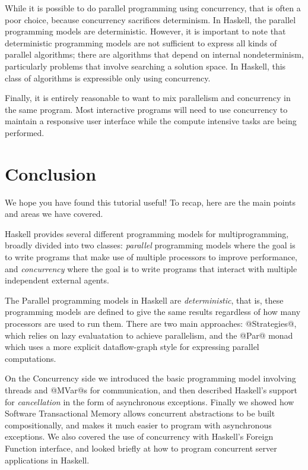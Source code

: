 \documentclass{llncs}
\newcommand{\Section}[2]{\section{#2}\label{sec:#1}}
\begin{document}
While it is possible to do parallel programming using concurrency,
that is often a poor choice, because concurrency sacrifices
determinism.  In Haskell, the parallel programming models are
deterministic.  However, it is important to note that deterministic
programming models are not sufficient to express all kinds of parallel
algorithms; there are algorithms that depend on internal
nondeterminism, particularly problems that involve searching a
solution space.  In Haskell, this class of algorithms is expressible
only using concurrency.

Finally, it is entirely reasonable to want to mix parallelism and
concurrency in the same program.  Most interactive programs will need
to use concurrency to maintain a responsive user interface while the
compute intensive tasks are being performed.





\Section{conclusion}{Conclusion}

We hope you have found this tutorial useful!  To recap, here are the
main points and areas we have covered.

Haskell provides several different programming models for
multiprogramming, broadly divided into two classes: \emph{parallel}
programming models where the goal is to write programs that make use
of multiple processors to improve performance, and \emph{concurrency}
where the goal is to write programs that interact with multiple
independent external agents.

The Parallel programming models in Haskell are \emph{deterministic},
that is, these programming models are defined to give the same results
regardless of how many processors are used to run them.  There are two
main approaches: @Strategies@, which relies on lazy evaluatation to
achieve parallelism, and the @Par@ monad which uses a more explicit
dataflow-graph style for expressing parallel computations.

On the Concurrency side we introduced the basic programming model
involving threads and @MVar@s for communication, and then described
Haskell's support for \emph{cancellation} in the form of asynchronous
exceptions.  Finally we showed how Software Transactional Memory
allows concurrent abstractions to be built compositionally, and makes
it much easier to program with asynchronous exceptions.  We also
covered the use of concurrency with Haskell's Foreign Function
interface, and looked briefly at how to program concurrent server
applications in Haskell.



\end{document}
